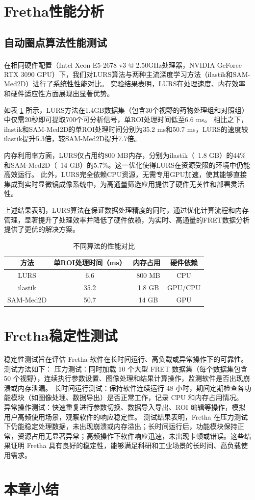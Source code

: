 \section{Fretha性能分析}

\subsection{自动圈点算法性能测试}
在相同硬件配置（Intel\textsuperscript{\textregistered} Xeon E5-2678 v3 @ 2.50GHz处理器，NVIDIA\textsuperscript{\textregistered} GeForce RTX 3090 GPU）下，我们对LURS算法与两种主流深度学习方法（ilastik和SAM-Med2D）进行了系统性性能对比。
实验结果表明，LURS在处理速度、内存效率和硬件适应性方面展现出显著优势。  

如表 \ref{tab:性能对比} 所示，LURS方法在1.4GB数据集（包含30个视野的药物处理组和对照组）中仅需20秒即可提取700个可分析信号，单ROI处理时间低至6.6 ms。
相比之下，ilastik和SAM-Med2D的单ROI处理时间分别为35.2 ms和50.7 ms，LURS的速度较ilastik提升5.3倍，较SAM-Med2D提升7.7倍。  

内存利用率方面，LURS仅占用约800 MB内存，分别为ilastik（~1.8 GB）的44\%和SAM-Med2D（~14 GB）的5.7\%。这一优化使得LURS在资源受限的环境中仍能高效运行。
此外，LURS完全依赖CPU资源，无需专用GPU加速，使其能够直接集成到实时显微镜成像系统中，为高通量筛选应用提供了硬件无关性和部署灵活性。  

上述结果表明，LURS算法在保证数据处理精度的同时，通过优化计算流程和内存管理，显著提升了处理效率并降低了硬件依赖，为实时、高通量的FRET数据分析提供了更优的解决方案。

\begin{table}[htbp]
    \centering
    \caption{不同算法的性能对比}
    \begin{tabular}{cccc}
    \toprule
    方法 & 单ROI处理时间（ms） & 内存占用 & 硬件依赖 \\
    \midrule
    LURS & 6.6 & ~800 MB & CPU \\
    ilastik & 35.2 & ~1.8 GB & GPU/CPU \\
    SAM-Med2D & 50.7 & ~14 GB & GPU \\
    \bottomrule
    \end{tabular}
    \label{tab:性能对比}
\end{table}

\section{Fretha稳定性测试}
稳定性测试旨在评估 Fretha 软件在长时间运行、高负载或异常操作下的可靠性。测试方法如下：
压力测试：同时加载 10 个大型 FRET 数据集（每个数据集包含 50 个视野），连续执行参数设置、图像处理和结果计算操作，监测软件是否出现崩溃或内存泄漏。
长时间运行测试：保持软件连续运行 48 小时，期间定期检查各功能模块（如图像处理、数据导出）是否正常工作，记录 CPU 和内存占用情况。
异常操作测试：快速重复进行参数切换、数据导入导出、ROI 编辑等操作，模拟用户高频使用场景，观察软件的响应稳定性。
测试结果表明，Fretha 在压力测试下仍能稳定处理数据，未出现崩溃或内存溢出；长时间运行后，功能模块保持正常，资源占用无显著异常；高频操作下软件响应迅速，未出现卡顿或错误。这些结果证明 Fretha 具有良好的稳定性，能够满足科研和工业场景的长时间、高负载使用需求。

\section{本章小结}